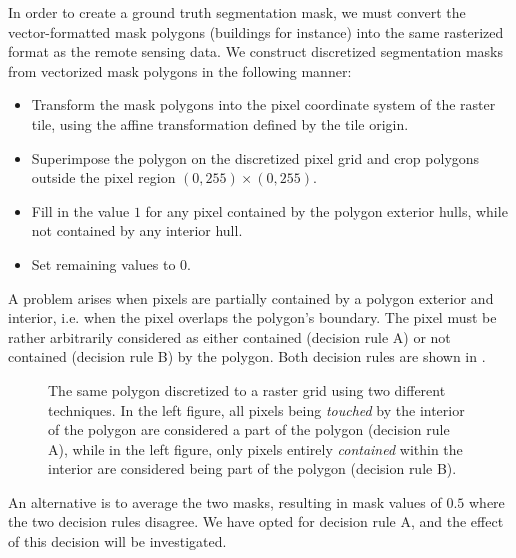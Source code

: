 In order to create a ground truth segmentation mask, we must convert the vector-formatted mask polygons (buildings for instance) into the same rasterized format as the remote sensing data.
We construct discretized segmentation masks from vectorized mask polygons in the following manner:

\begin{itemize}
  \item Transform the mask polygons into the pixel coordinate system of the raster tile, using the affine transformation defined by the tile origin.
  \item Superimpose the polygon on the discretized pixel grid and crop polygons outside the pixel region $(0, 255) \times (0, 255)$.
  \item Fill in the value $1$ for any pixel contained by the polygon exterior hulls, while not contained by any interior hull.
  \item Set remaining values to $0$.
\end{itemize}

A problem arises when pixels are partially contained by a polygon exterior and interior, i.e. when the pixel overlaps the polygon's boundary.
The pixel must be rather arbitrarily considered as either contained (decision rule A) or not contained (decision rule B) by the polygon.
Both decision rules are shown in .

\begin{figure}[H]
  \centering
  
  \hspace{2em}
  
  \caption{
    The same polygon discretized to a raster grid using two different techniques.
    In the left figure, all pixels being \textit{touched} by the interior of the polygon
    are considered a part of the polygon (decision rule A), while in the left figure, only pixels
    entirely \textit{contained} within the interior are considered being part
    of the polygon (decision rule B).
  }
  \label{fig:pixel-containment}
\end{figure}

An alternative is to average the two masks, resulting in mask values of $0.5$ where the two decision rules disagree.
We have opted for decision rule A, and the effect of this decision will be investigated.
